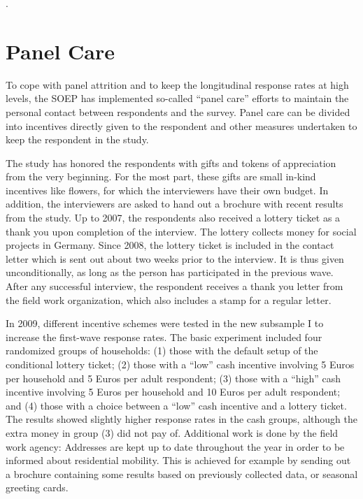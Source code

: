 \documentclass[letterpaper,10pt,openany,onesideH,english]{sphinxmanual}
\begin{document}
.


\section{Panel Care}
\label{\detokenize{Survey Design/index:panel-care}}
To cope with panel attrition and to keep the longitudinal response rates at high levels, the SOEP has implemented so-called “panel care” efforts to maintain the personal contact between respondents and the survey. Panel care can be divided into incentives directly given to the respondent and other measures undertaken to keep the respondent in the study.

The study has honored the respondents with gifts and tokens of appreciation from the very beginning. For the most part, these gifts are small in-kind incentives like flowers, for which the interviewers have their own budget. In addition, the interviewers are asked to hand out a brochure with recent results from the study. Up to 2007, the respondents also received a lottery ticket as a thank you upon completion of the interview. The lottery collects money for social projects in Germany. Since 2008, the lottery ticket is included in the contact letter which is sent out about two weeks prior to the interview. It is thus given unconditionally, as long as the person has participated in the previous wave. After any successful interview, the respondent receives a thank you letter from the field work organization, which also includes a stamp for a regular letter.

In 2009, different incentive schemes were tested in the new subsample I to increase the first-wave response rates. The basic experiment included four randomized groups of households: (1) those with the default setup of the conditional lottery ticket; (2) those with a “low” cash incentive involving 5 Euros per household and 5 Euros per adult respondent; (3) those with a “high” cash incentive involving 5 Euros per household and 10 Euros per adult respondent; and (4) those with a choice between a “low” cash incentive and a lottery ticket. The results showed slightly higher response rates in the cash groups, although the extra money in group (3) did not pay of. Additional work is done by the field work agency: Addresses are kept up to date throughout the year in order to be informed about residential mobility. This is achieved for example by sending out a brochure containing some results based on previously collected data, or seasonal greeting cards.
\end{document}
